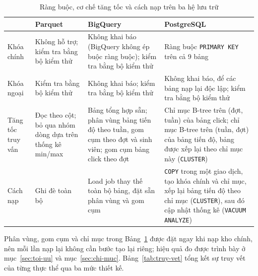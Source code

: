 \begin{table}[htbp]
\centering
\small
\begin{tabularx}{\textwidth}{|p{2.6cm}|X|X|X|}
\hline
& \textbf{Parquet} & \textbf{BigQuery} & \textbf{PostgreSQL} \\ \hline
Khóa chính & Không hỗ trợ; kiểm tra bằng bộ kiểm thử & Không khai báo (BigQuery không ép buộc ràng buộc); kiểm tra bằng bộ kiểm thử & Ràng buộc \texttt{PRIMARY KEY} trên cả 9 bảng \\ \hline
Khóa ngoại & Kiểm tra bằng bộ kiểm thử & Không khai báo; kiểm tra bằng bộ kiểm thử & Không khai báo, để các bảng nạp lại độc lập; kiểm tra bằng bộ kiểm thử \\ \hline
Tăng tốc truy vấn & Đọc theo cột; bỏ qua nhóm dòng dựa trên thống kê min/max & Bảng tổng hợp sẵn; phân vùng bảng tiến độ theo tuần, gom cụm theo đợt và sinh viên; gom cụm bảng click theo đợt & Chỉ mục B-tree trên (đợt, tuần) của bảng click; chỉ mục B-tree trên (tuần, đợt) của bảng tiến độ, bảng được xếp lại theo chỉ mục này (\texttt{CLUSTER}) \\ \hline
Cách nạp & Ghi đè toàn bộ & Load job thay thế toàn bộ bảng, đặt sẵn phân vùng và gom cụm & \texttt{COPY} trong một giao dịch, tạo khóa chính và chỉ mục, xếp lại bảng tiến độ theo chỉ mục (\texttt{CLUSTER}), sau đó cập nhật thống kê (\texttt{VACUUM ANALYZE}) \\ \hline
\end{tabularx}
\caption{Ràng buộc, cơ chế tăng tốc và cách nạp trên ba hệ lưu trữ}
\label{tab:vat-ly}
\end{table}

Phân vùng, gom cụm và chỉ mục trong Bảng~\ref{tab:vat-ly} được đặt ngay khi nạp kho chính,
nên mỗi lần nạp lại không cần bước tạo lại riêng; hiệu quả đo được trình bày ở
mục~\ref{sec:toi-uu} và mục~\ref{sec:chi-muc}. Bảng~\ref{tab:truy-vet} tổng kết sự truy vết của từng thực thể qua ba
mức thiết kế.

